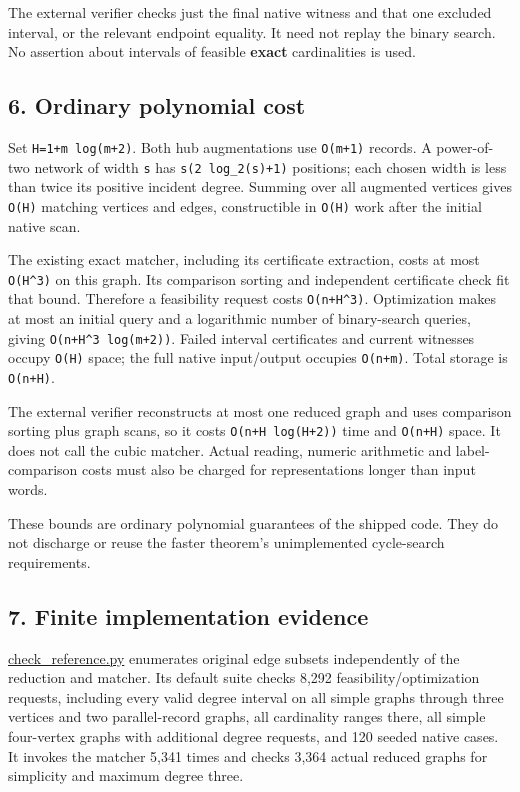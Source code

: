 The external verifier checks just the final native witness and that one excluded interval, or the relevant endpoint equality. It need not replay the binary search. No assertion about intervals of feasible \textbf{exact} cardinalities is used.

\hypertarget{af-5f2ce72611-ordinary-polynomial-cost}{%
\subsection{6. Ordinary polynomial cost}\label{af-5f2ce72611-ordinary-polynomial-cost}}

Set \texttt{H=1+m\ log(m+2)}. Both hub augmentations use \texttt{O(m+1)} records. A power-of-two network of width \texttt{s} has \texttt{s(2\ log\_2(s)+1)} positions; each chosen width is less than twice its positive incident degree. Summing over all augmented vertices gives \texttt{O(H)} matching vertices and edges, constructible in \texttt{O(H)} work after the initial native scan.

The existing exact matcher, including its certificate extraction, costs at most \texttt{O(H\^{}3)} on this graph. Its comparison sorting and independent certificate check fit that bound. Therefore a feasibility request costs \texttt{O(n+H\^{}3)}. Optimization makes at most an initial query and a logarithmic number of binary-search queries, giving \texttt{O(n+H\^{}3\ log(m+2))}. Failed interval certificates and current witnesses occupy \texttt{O(H)} space; the full native input/output occupies \texttt{O(n+m)}. Total storage is \texttt{O(n+H)}.

The external verifier reconstructs at most one reduced graph and uses comparison sorting plus graph scans, so it costs \texttt{O(n+H\ log(H+2))} time and \texttt{O(n+H)} space. It does not call the cubic matcher. Actual reading, numeric arithmetic and label-comparison costs must also be charged for representations longer than input words.

These bounds are ordinary polynomial guarantees of the shipped code. They do not discharge or reuse the faster theorem's unimplemented cycle-search requirements.

\hypertarget{af-5f2ce72611-finite-implementation-evidence}{%
\subsection{7. Finite implementation evidence}\label{af-5f2ce72611-finite-implementation-evidence}}

\href{https://github.com/icekylinx/algorithm-frontier/blob/main/problems/degree-constrained-subgraphs/verify/check_reference.py}{check\_reference.py} enumerates original edge subsets independently of the reduction and matcher. Its default suite checks 8,292 feasibility/optimization requests, including every valid degree interval on all simple graphs through three vertices and two parallel-record graphs, all cardinality ranges there, all simple four-vertex graphs with additional degree requests, and 120 seeded native cases. It invokes the matcher 5,341 times and checks 3,364 actual reduced graphs for simplicity and maximum degree three.

